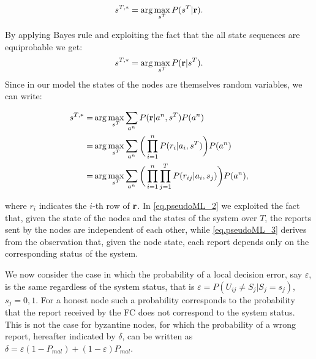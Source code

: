 \documentclass[10pt,peerreview,draftcls,onecolumn]{IEEEtran}
\begin{document}
\begin{equation}
s^{T,*} = \arg\max_{s^T} P(s^T | {\bf r}).
\label{eq.map}
\end{equation}


By applying Bayes rule and exploiting the fact that the all state sequences are equiprobable we get:
\begin{equation}
s^{T,*} =  \arg\max_{s^T} P({\bf r} | s^T ).
\label{eq.ML}
\end{equation}
Since in our model the states of the nodes are themselves random variables, we can write:


\begin{align}
s^{T,*}  = & \arg\max_{s^T} \sum_{a^n} P({\bf r} | a^n, s^T) P(a^n) \label{eq.pseudoML}\\
= & \arg\max_{s^T} \sum_{a^n} \bigg(\prod_{i=1}^n P(r_i | a_i, s^T )\bigg) P(a^n)\label{eq.pseudoML_2}\\
= & \arg\max_{s^T} \sum_{a^n} \bigg(\prod_{i=1}^n \prod_{j=1}^T P(r_{ij} | a_i, s_j )\bigg) P(a^n),\label{eq.pseudoML_3}
\end{align}


where $r_i$ indicates the $i$-th row of ${\bf r}$. In \eqref{eq.pseudoML_2} we exploited the fact that, given the state of the nodes and the states of the system over $T$, the reports sent by the nodes are independent of each other, while \eqref{eq.pseudoML_3} derives from the observation that, given the node state, each report depends only on the corresponding status of the system.


We now consider the case in which the probability of a local decision error, say $\varepsilon$, is the same regardless of the system status, that is $\varepsilon = P(U_{ij} \neq S_j|S_j = s_j)$, $s_j = 0,1$. For a honest node such a probability corresponds to the probability that the report received by the FC does not correspond to the system status. This is not the case for byzantine nodes, for which the probability of a wrong report, hereafter indicated by $\delta$, can be written as $\delta = \varepsilon (1 - P_{mal}) + (1 - \varepsilon)P_{mal}$.
\end{document}

